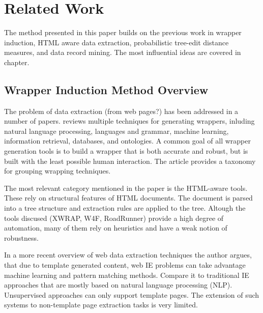 \chapter{Related Work}




The method presented in this paper builds on the previous work in wrapper induction, HTML aware data extraction, probabilistic tree-edit distance measures, and data record mining. The most influential ideas are covered in chapter.


\section{Wrapper Induction Method Overview}

The problem of data extraction (from web pages?) has been addressed in a number of papers. \cite{Laender:2002:BSW:565117.565137} reviews multiple techniques for generating wrappers, inluding natural language processing, languages and grammar, machine learning, information retrieval, databases, and ontologies. A common goal of all wrapper generation tools is to build a wrapper that is both accurate and robust, but is built with the least possible human interaction. The article provides a taxonomy for grouping wrapping techniques.

The most relevant category mentioned in the paper is the HTML-aware tools. These rely on structural features of HTML documents. The document is parsed into a tree structure and extraction rules are applied to the tree. Altough the tools discused (XWRAP, W4F, RoadRunner) provide a high degree of automation, many of them rely on heuristics and have a weak notion of robustness.

In a more recent overview of web data extraction techniques \cite{Chang:2006:SWI:1159162.1159300} the author argues, that due to template generated content, web IE problems can take advantage machine learning and pattern matching methods. Compare it to traditional IE approaches that are mostly based on natural language processing (NLP). Unsupervised approaches can only support template pages. The extension of such systems to non-template page extraction tasks is very limited.

